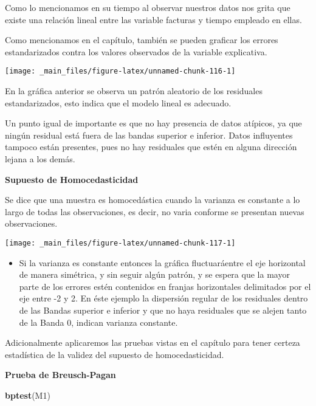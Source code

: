 \documentclass[
  a4paper,
  oneside,
  openany]{book}
\newenvironment{Shaded}{\begin{snugshade}}{\end{snugshade}}
\newcommand{\FunctionTok}[1]{\textcolor[rgb]{0.13,0.29,0.53}{\textbf{#1}}}
\newcommand{\NormalTok}[1]{#1}
\providecommand{\tightlist}{%
  \setlength{\itemsep}{0pt}\setlength{\parskip}{0pt}}
\begin{document}
Como lo mencionamos en su tiempo al observar nuestros datos nos grita que existe una relación lineal entre las variable facturas y tiempo empleado en ellas.

Como mencionamos en el capítulo, también se pueden graficar los errores estandarizados contra los valores observados de la variable explicativa.

\begin{center}\texttt{[image: \_main\_files/figure-latex/unnamed-chunk-116-1]} \end{center}

En la gráfica anterior se observa un patrón aleatorio de los residuales estandarizados, esto indica que el modelo lineal es adecuado.

Un punto igual de importante es que no hay presencia de datos atípicos, ya que ningún residual está fuera de las bandas superior e inferior. Datos influyentes tampoco están presentes, pues no hay residuales que estén en alguna dirección lejana a los demás.

\textbf{Supuesto de Homocedasticidad}

Se dice que una muestra es homocedástica cuando la varianza es constante a lo largo de todas las observaciones, es decir, no varia conforme se presentan nuevas observaciones.

\begin{center}\texttt{[image: \_main\_files/figure-latex/unnamed-chunk-117-1]} \end{center}

\begin{itemize}
\tightlist
\item
  Si la varianza es constante entonces la gráfica fluctuaráentre el eje horizontal de manera simétrica, y sin seguir algún patrón, y se espera que la mayor parte de los errores estén contenidos en franjas horizontales delimitados por el eje entre -2 y 2. En éste ejemplo la dispersión regular de los residuales dentro de las Bandas superior e inferior y que no haya residuales que se alejen tanto de la Banda 0, indican varianza constante.
\end{itemize}

Adicionalmente aplicaremos las pruebas vistas en el capítulo para tener certeza estadística de la validez del supuesto de homocedasticidad.

\textbf{Prueba de Breusch-Pagan}

\begin{Shaded}
\begin{Highlighting}[]
\FunctionTok{bptest}\NormalTok{(M1)}
\end{Highlighting}
\end{Shaded}
\end{document}
